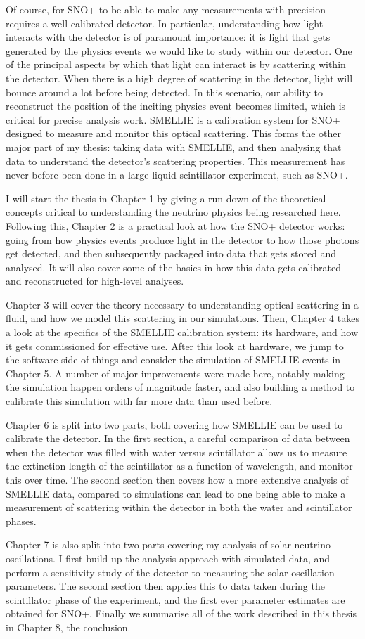 Of course, for SNO+ to be able to make any measurements with precision requires a well-calibrated detector. In particular, understanding how light interacts with the detector is of paramount importance: it is light that gets generated by the physics events we would like to study within our detector. One of the principal aspects by which that light can interact is by scattering within the detector. When there is a high degree of scattering in the detector, light will bounce around a lot before being detected. In this scenario, our ability to reconstruct the position of the inciting physics event becomes limited, which is critical for precise analysis work. SMELLIE is a calibration system for SNO+ designed to measure and monitor this optical scattering. This forms the other major part of my thesis: taking data with SMELLIE, and then analysing that data to understand the detector's scattering properties. This measurement has never before been done in a large liquid scintillator experiment, such as SNO+.

I will start the thesis in Chapter 1 by giving a run-down of the theoretical concepts critical to understanding the neutrino physics being researched here. Following this, Chapter 2 is a practical look at how the SNO+ detector works: going from how physics events produce light in the detector to how those photons get detected, and then subsequently packaged into data that gets stored and analysed. It will also cover some of the basics in how this data gets calibrated and reconstructed for high-level analyses.

Chapter 3 will cover the theory necessary to understanding optical scattering in a fluid, and how we model this scattering in our simulations. Then, Chapter 4 takes a look at the specifics of the SMELLIE calibration system: its hardware, and how it gets commissioned for effective use. After this look at hardware, we jump to the software side of things and consider the simulation of SMELLIE events in Chapter 5. A number of major improvements were made here, notably making the simulation happen orders of magnitude faster, and also building a method to calibrate this simulation with far more data than used before.

Chapter 6 is split into two parts, both covering how SMELLIE can be used to calibrate the detector. In the first section, a careful comparison of data between when the detector was filled with water versus scintillator allows us to measure the extinction length of the scintillator as a function of wavelength, and monitor this over time. The second section then covers how a more extensive analysis of SMELLIE data, compared to simulations can lead to one being able to make a measurement of scattering within the detector in both the water and scintillator phases.

Chapter 7 is also split into two parts covering my analysis of solar neutrino oscillations. I first build up the analysis approach with simulated data, and perform a sensitivity study of the detector to measuring the solar oscillation parameters. The second section then applies this to data taken during the scintillator phase of the experiment, and the first ever parameter estimates are obtained for SNO+. Finally we summarise all of the work described in this thesis in Chapter 8, the conclusion.